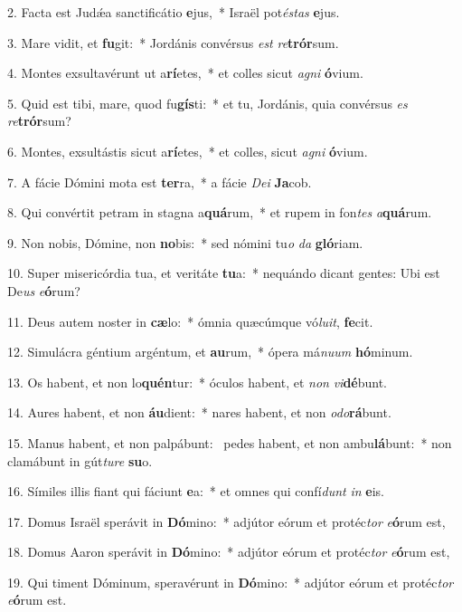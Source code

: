 2. Facta est Judǽa sanctificátio \textbf{e}jus,~*  Israël pot\textit{és}\textit{tas} \textbf{e}jus.\

3. Mare vidit, et \textbf{fu}git:~*  Jordánis convérsus \textit{est} \textit{re}\textbf{trór}sum.\

4. Montes exsultavérunt ut a\textbf{rí}etes,~*  et colles sicut \textit{a}\textit{gni} \textbf{ó}vium.\

5. Quid est tibi, mare, quod fu\textbf{gís}ti:~*  et tu, Jordánis, quia convérsus \textit{es} \textit{re}\textbf{trór}sum?\

6. Montes, exsultástis sicut a\textbf{rí}etes,~*  et colles, sicut \textit{a}\textit{gni} \textbf{ó}vium.\

7. A fácie Dómini mota est \textbf{ter}ra,~*  a fácie \textit{De}\textit{i} \textbf{Ja}cob.\

8. Qui convértit petram in stagna a\textbf{quá}rum,~*  et rupem in fon\textit{tes} \textit{a}\textbf{quá}rum.\

9. Non nobis, Dómine, non \textbf{no}bis:~*  sed nómini tu\textit{o} \textit{da} \textbf{gló}riam.\

10. Super misericórdia tua, et veritáte \textbf{tu}a:~*  nequándo dicant gentes: Ubi est De\textit{us} \textit{e}\textbf{ó}rum?\

11. Deus autem noster in \textbf{cæ}lo:~*  ómnia quæcúmque vó\textit{lu}\textit{it}, \textbf{fe}cit.\

12. Simulácra géntium argéntum, et \textbf{au}rum,~*  ópera má\textit{nu}\textit{um} \textbf{hó}minum.\

13. Os habent, et non lo\textbf{quén}tur:~*  óculos habent, et \textit{non} \textit{vi}\textbf{dé}bunt.\

14. Aures habent, et non \textbf{áu}dient:~*  nares habent, et non \textit{o}\textit{do}\textbf{rá}bunt.\

15. Manus habent, et non palpábunt: \dag\  pedes habent, et non ambu\textbf{lá}bunt:~*  non clamábunt in gút\textit{tu}\textit{re} \textbf{su}o.\

16. Símiles illis fiant qui fáciunt \textbf{e}a:~*  et omnes qui confí\textit{dunt} \textit{in} \textbf{e}is.\

17. Domus Israël sperávit in \textbf{Dó}mino:~*  adjútor eórum et protéc\textit{tor} \textit{e}\textbf{ó}rum est,\

18. Domus Aaron sperávit in \textbf{Dó}mino:~*  adjútor eórum et protéc\textit{tor} \textit{e}\textbf{ó}rum est,\

19. Qui timent Dóminum, speravérunt in \textbf{Dó}mino:~*  adjútor eórum et protéc\textit{tor} \textit{e}\textbf{ó}rum est.\

